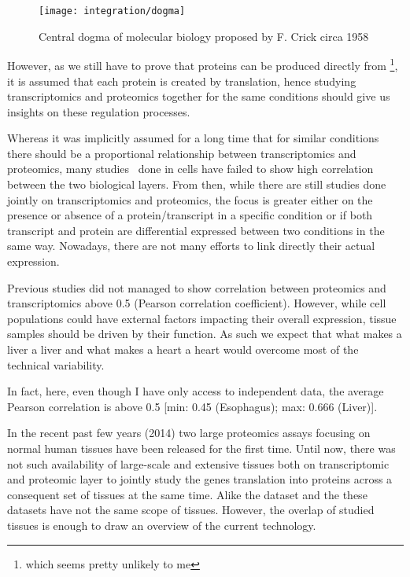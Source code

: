 \begin{figure}
    \texttt{[image: integration/dogma]}\centering
    \caption{\label{dogma} Central dogma of molecular biology proposed by F. Crick circa 1958}
\end{figure}

However, as we still have to prove that proteins can be produced directly
from \DNA \footnote{which seems pretty unlikely to me}, it is assumed that
each protein is created by translation, hence studying
transcriptomics and proteomics together for the same conditions should give us
insights on these regulation processes.

Whereas it was implicitly assumed for a long time that for similar conditions
there should be a proportional relationship between transcriptomics and proteomics,
many studies\
done in cells have failed to show high correlation between the two biological layers.
From then, while there are still studies done jointly on transcriptomics and
proteomics, the focus is greater either on the presence or absence of a
protein/transcript in a specific condition or if both transcript and protein
are differential expressed between two conditions in the same way.
Nowadays, there are not many efforts to link directly their actual expression.

Previous studies did not managed to show correlation between proteomics and
transcriptomics above 0.5 (Pearson correlation coefficient).
However, while cell populations could have external factors impacting their overall
expression, tissue samples should be driven by their function.
As such we expect that what makes a liver a liver and what makes a heart a heart
would overcome most of the technical variability.

In fact, here, even though I have only access to independent data,
the average Pearson correlation is above 0.5
[min: 0.45 (Esophagus); max: 0.666 (Liver)].


In the recent past few years (2014) two large proteomics assays focusing on normal
human tissues have been released for the first time.
Until now, there was not such availability of large-scale and extensive tissues
both on transcriptomic and proteomic layer to jointly study the genes
translation into proteins across a consequent set of tissues
at the same time. Alike the  dataset and the 
these datasets have not the same scope of tissues. However, the overlap of
studied tissues is enough to draw an overview of the current technology.


